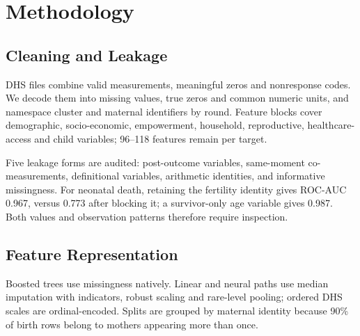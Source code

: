 \documentclass[conference]{IEEEtran}
\begin{document}
\section{Methodology}

\subsection{Cleaning and Leakage}
\label{sec:leakage}
DHS files combine valid measurements, meaningful zeros and nonresponse codes.
We decode them into missing values, true zeros and common numeric units, and
namespace cluster and maternal identifiers by round. Feature blocks cover
demographic, socio-economic, empowerment, household, reproductive,
healthcare-access and child variables; 96--118 features remain per target.

Five leakage forms are audited: post-outcome variables, same-moment
co-measurements, definitional variables, arithmetic identities, and informative
missingness. For neonatal death, retaining the fertility identity gives
ROC-AUC 0.967, versus 0.773 after blocking it; a survivor-only age variable
gives 0.987. Both values and observation patterns therefore require inspection.

\begin{table}[t]
\caption{Sensitivity to leakage controls for neonatal death}
\label{tab:leakage}
\centering
\small
{}
\end{table}

\subsection{Feature Representation}
Boosted trees use missingness natively. Linear and neural paths use median
imputation with indicators, robust scaling and rare-level pooling; ordered DHS
scales are ordinal-encoded. Splits are grouped by maternal identity because
90\% of birth rows belong to mothers appearing more than once.
\end{document}
